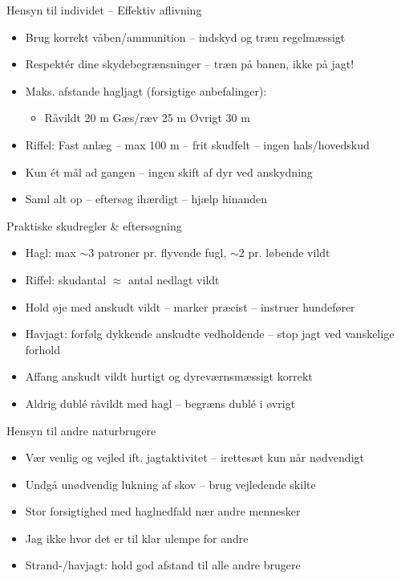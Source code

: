 \begin{frame}{Hensyn til individet – Effektiv aflivning}
\begin{itemize}
\item Brug korrekt våben/ammunition – indskyd og træn regelmæssigt
\item Respektér dine skydebegrænsninger – træn på banen, ikke på jagt!
\item Maks. afstande hagljagt (forsigtige anbefalinger):
  \begin{itemize}
  \item Råvildt 20 m \quad Gæs/ræv 25 m \quad Øvrigt 30 m
  \end{itemize}
\item Riffel: Fast anlæg – max 100 m – frit skudfelt – ingen hals/hovedskud
\item Kun ét mål ad gangen – ingen skift af dyr ved anskydning
\item Saml alt op – eftersøg ihærdigt – hjælp hinanden
\end{itemize}
\end{frame}

\begin{frame}{Praktiske skudregler \& eftersøgning}
\begin{itemize}
\item Hagl: max $\sim$3 patroner pr. flyvende fugl, $\sim$2 pr. løbende vildt
\item Riffel: skudantal $\approx$ antal nedlagt vildt
\item Hold øje med anskudt vildt – marker præcist – instruer hundefører
\item Havjagt: forfølg dykkende anskudte vedholdende – stop jagt ved vanskelige forhold
\item Affang anskudt vildt hurtigt og dyreværnsmæssigt korrekt
\item Aldrig dublé råvildt med hagl – begræns dublé i øvrigt
\end{itemize}
\end{frame}

\begin{frame}{Hensyn til andre naturbrugere}
\begin{itemize}
\item Vær venlig og vejled ift. jagtaktivitet – irettesæt kun når nødvendigt
\item Undgå unødvendig lukning af skov – brug vejledende skilte
\item Stor forsigtighed med haglnedfald nær andre mennesker
\item Jag ikke hvor det er til klar ulempe for andre
\item Strand-/havjagt: hold god afstand til alle andre brugere
\end{itemize}
\end{frame}

